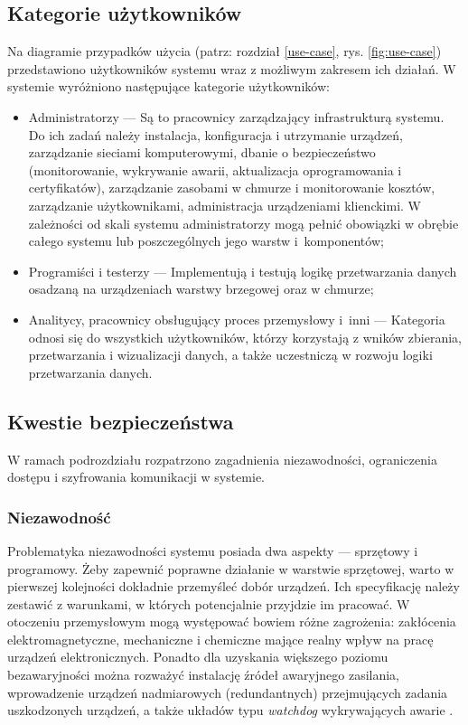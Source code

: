 \documentclass[a4paper, 12pt, twoside]{article}
\begin{document}
\subsection{Kategorie użytkowników}

Na diagramie przypadków użycia (patrz: rozdział \ref{use-case}, rys. \ref{fig:use-case})
przedstawiono użytkowników systemu wraz z możliwym zakresem ich działań.
W systemie wyróżniono następujące kategorie użytkowników:
\begin{itemize}
      \itemsep0em
      \item Administratorzy --- Są to pracownicy zarządzający infrastrukturą systemu.
            Do ich zadań należy instalacja, konfiguracja i utrzymanie urządzeń,
            zarządzanie sieciami komputerowymi, dbanie o bezpieczeństwo (monitorowanie,
            wykrywanie awarii, aktualizacja oprogramowania i certyfikatów),  zarządzanie zasobami w chmurze
            i monitorowanie kosztów, zarządzanie użytkownikami, administracja urządzeniami klienckimi.
            W zależności od skali systemu administratorzy mogą pełnić obowiązki
            w obrębie całego systemu lub poszczególnych jego warstw i~komponentów;
      \item Programiści i testerzy --- Implementują i testują logikę przetwarzania
            danych osadzaną na urządzeniach warstwy brzegowej oraz w chmurze;
      \item Analitycy, pracownicy obsługujący proces przemysłowy i~inni ---
            Kategoria odnosi się do wszystkich użytkowników, którzy korzystają z wników zbierania, przetwarzania
            i wizualizacji danych, a także uczestniczą w rozwoju logiki przetwarzania danych.
\end{itemize}

\subsection{Kwestie bezpieczeństwa}

W ramach podrozdziału rozpatrzono zagadnienia niezawodności, ograniczenia dostępu 
i szyfrowania komunikacji w systemie.

\subsubsection{Niezawodność}

Problematyka niezawodności systemu posiada dwa aspekty --- sprzętowy i programowy.
Żeby zapewnić poprawne działanie w warstwie sprzętowej, warto w pierwszej
kolejności dokładnie przemyśleć dobór urządzeń. Ich specyfikację należy zestawić
z warunkami, w których potencjalnie przyjdzie im pracować. W otoczeniu przemysłowym
mogą występować bowiem różne zagrożenia: zakłócenia elektromagnetyczne,
mechaniczne i chemiczne mające realny wpływ na pracę urządzeń elektronicznych.
Ponadto dla uzyskania większego poziomu bezawaryjności można rozważyć
instalację źródeł awaryjnego zasilania, wprowadzenie urządzeń nadmiarowych (redundantnych)
przejmujących zadania uszkodzonych urządzeń, a także układów typu \emph{watchdog}
wykrywających awarie \cite{isp}.
\end{document}
